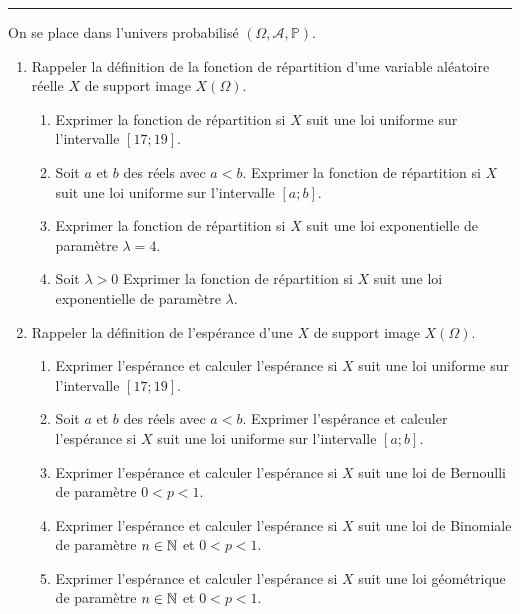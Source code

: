 \documentclass[../PolyS4.tex]{subfiles}
\begin{document}
\hfill\break
\hrule
\hfill\break


On se place dans l'univers probabilisé $(\Omega,\mathcal{A},\mathbb{P})$.\\
\begin{enumerate}
\item Rappeler la définition de la fonction de répartition d'une variable aléatoire réelle $X$ de support image $X(\Omega)$.
\begin{enumerate}
\item
Exprimer la fonction de répartition si $X$ suit une loi uniforme sur l'intervalle $[17; 19]$.
\item Soit $a$ et $b$ des réels avec $a<b$.
Exprimer la fonction de répartition si $X$ suit une loi uniforme sur l'intervalle $[a; b]$. 
\item
Exprimer la fonction de répartition si $X$ suit une loi exponentielle de paramètre $\lambda=4$.
\item Soit $\lambda>0$
Exprimer la fonction de répartition si $X$ suit une loi exponentielle de paramètre $\lambda$.
 
\end{enumerate}
\item Rappeler la définition de l'espérance d'une $X$ de support image $X(\Omega)$.
\begin{enumerate}
\item
Exprimer l'espérance et calculer l'espérance si $X$ suit une loi uniforme sur l'intervalle $[17; 19]$.
\item Soit $a$ et $b$ des réels avec $a<b$.
Exprimer l'espérance et calculer l'espérance si $X$ suit une loi uniforme sur l'intervalle $[a; b]$. 
\item 
Exprimer l'espérance et calculer l'espérance si $X$ suit une loi de Bernoulli de paramètre $0<p<1$.
\item 
Exprimer l'espérance et calculer l'espérance si $X$ suit une loi de Binomiale de paramètre $n\in\mathbb{N}$ et $0<p<1$.
\item 
Exprimer l'espérance et calculer l'espérance si $X$ suit une loi géométrique de paramètre $n\in\mathbb{N}$ et $0<p<1$.\\
\end{enumerate}

\end{enumerate}
\end{document}
